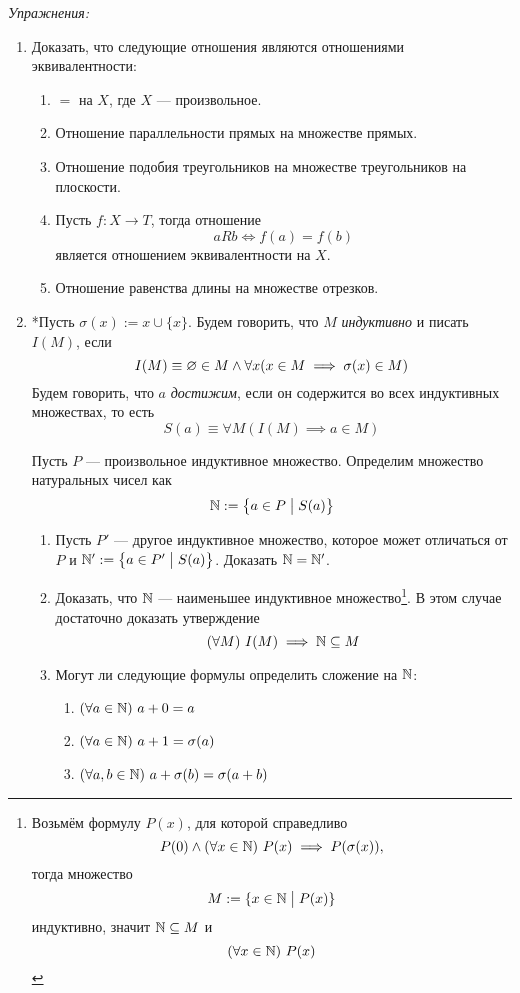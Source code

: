 \vspace{1em}
{\it Упражнения:}
\begin{enumerate}
	\item{}Доказать, что следующие отношения являются отношениями эквивалентности:
	\begin{enumerate}
		\item{}$=$ на $X$, где $X$ --- произвольное.
		\item{}Отношение параллельности прямых на множестве прямых.
		\item{}Отношение подобия треугольников на множестве треугольников
		на плоскости.
		\item{}Пусть $f:X\to T$, тогда отношение\label{ex:fn_equiv}
		\[
			aRb\iff f(a)=f(b)
		\]
		является отношением эквивалентности на $X$.
		\item{}Отношение равенства длины на множестве отрезков.
	\end{enumerate}
\item{}*Пусть $\sigma(x):=x\cup\{x\}$. Будем говорить, что $M$ 
	{\it индуктивно} и писать $I(M)$, если
		\[
			I(M)\equiv \varnothing\in M\land \forall x(x\in M\implies \sigma(x)\in M)
		\]
		Будем говорить, что $a$ {\it достижим}, если он содержится во всех индуктивных 
		множествах, то есть 
		\[
			S(a)\equiv \forall M(I(M)\implies a\in M)
		\]

		Пусть $P$ --- произвольное индуктивное множество.
		Определим множество натуральных чисел как
		\[
			\mathbb N:=\left\{a\in P\;\big|\; S(a)\right\}
		\]
		\begin{enumerate}
			\item{}Пусть $P'$ --- другое индуктивное множество, которое может 
				отличаться от $P$ и $\mathbb N':=\left\{a\in P'\;\big|\; S(a)\right\}$.
				Доказать $\mathbb N=\mathbb N'$.
			\item{}Доказать, что $\mathbb N$ --- наименьшее индуктивное множество\footnote{
					Возьмём формулу $P(x)$, для которой справедливо
					\[
						P(0)\land (\forall x\in\mathbb N)~P(x)\implies P(\sigma(x)),
					\]
					тогда множество 
					\[
						M:=\{x\in\mathbb N\;\big|\; P(x)\}
					\]
					индуктивно, значит $\mathbb N\subseteq M$ и 
					\[
						(\forall x\in\mathbb N)~P(x)
					\]
				}.
				В этом случае достаточно доказать утверждение 
				\[
					(\forall M)~I(M)\implies\mathbb N\subseteq M
				\]
			\item{}Могут ли следующие формулы определить 
				сложение на $\mathbb N$:
				\begin{enumerate}
					\item{}$(\forall a\in\mathbb N)~a+0=a$
					\item{}$(\forall a\in\mathbb N)~a+1=\sigma(a)$
					\item{}$(\forall a,b\in\mathbb N)~a+\sigma(b)=\sigma(a+b)$
				\end{enumerate}
		\end{enumerate}
\end{enumerate}
